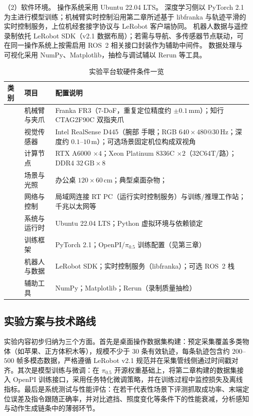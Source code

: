 （2）软件环境。
操作系统采用 Ubuntu 22.04 LTS。
深度学习侧以 PyTorch 2.1 为主进行模型训练；机械臂实时控制沿用第二章所述基于 libfranka 与轨迹平滑的实时控制服务，上位机经套接字协议与 LeRobot 客户端协同。
机器人数据与遥控录制依托 LeRobot SDK（v2.1 数据布局）；若需与导航、多传感器节点联动，可在同一操作系统上按需启用 ROS~2 相关接口封装作为辅助中间件。
数据处理与可视化采用 NumPy、Matplotlib，抽检与调试辅以 Rerun 等工具。

\begin{table}[htbp]
  \centering
  \small
  \caption{实验平台软硬件条件一览}
  \label{tab:intro-lab-env}
  \begin{tabular}{>{\raggedright\arraybackslash}p{1.6cm}>{\raggedright\arraybackslash}p{2.8cm}>{\raggedright\arraybackslash}p{8.4cm}}
    \toprule
    类别 & 项目 & 配置说明 \\
    \midrule
    \multirow{5}{*}{硬件} & 机械臂与夹爪 & Franka FR3（7-DoF，重复定位精度约 $\pm 0.1\,\mathrm{mm}$）；知行 CTAG2F90C 双指夹爪 \\
      & 视觉传感器 & Intel RealSense D445（腕部 手眼；RGB $640\times480@30\,\mathrm{Hz}$；深度约 $0.1$--$10\,\mathrm{m}$）；可选场景固定机位构成双视角 \\
      & 计算节点 & RTX A6000 $\times 4$；Xeon Platinum 8336C $\times 2$（32C64T/路）；DDR4 $32\,\mathrm{GB}\times 8$ \\
      & 场景与光照 & 办公桌 $120\times 60\,\mathrm{cm}$；典型桌面杂物； \\
      & 网络与控制 & 局域网连接 RT PC（运行实时控制服务）与训练/推理工作站；千兆以太网等 \\
    \midrule
    \multirow{4}{*}{软件} & 系统与运行时 & Ubuntu 22.04 LTS；Python 虚拟环境与依赖锁定 \\
      & 训练框架 & PyTorch 2.1；OpenPI/$\pi_{0.5}$ 训练配置（见第三章） \\
      & 机器人与数据 & LeRobot SDK；实时控制服务（libfranka）；可选 ROS~2 栈 \\
      & 辅助工具 & NumPy；Matplotlib；Rerun（录制质量抽检） \\
    \bottomrule
  \end{tabular}
\end{table}

\subsection{实验方案与技术路线}

实验内容初步归纳为三个方面。首先是桌面操作数据集构建：预定采集覆盖多类物体（如苹果、正方体积木等），规模不少于 30 条有效轨迹，每条轨迹包含约 $200$--$500$ 帧多模态数据，严格遵循 LeRobot v2.1 规范并在采集管线侧通过时间戳对齐。其次是模型训练与微调：在 $\pi_{0.5}$ 开源权重基础上，将第二章构建的数据集接入 OpenPI 训练接口，采用任务特化微调策略，并在训练过程中监控损失及离线指标。最后是系统测试与性能评估：在若干代表性场景下评测抓取成功率、末端定位误差及指令跟随正确率，并对比遮挡、照度变化等条件下的性能衰减，分析感知与动作生成链条中的薄弱环节。

